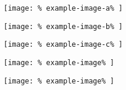 \documentclass{article}
\newlength{%
		\vamaxheight%
	}
\begin{document}
%

\noindent
\begin{minipage}[b][\ht\vabox][b]{%
		.10\textwidth%
	}
	\centering
	\texttt{[image: \%
		example-image-a\%
	]}
\end{minipage}
%
\hfill
\begin{minipage}[b][\ht\vabox][t]{%
		.15\textwidth%
	}
	\centering
	\texttt{[image: \%
		example-image-b\%
	]}
\end{minipage}
%
\hfill
\begin{minipage}[b][\ht\vabox][t]{%
		.20\textwidth%
	}
	\centering
	\texttt{[image: \%
		example-image-c\%
	]}
\end{minipage}
%
\hfill
\begin{minipage}[b][\ht\vabox][c]{%
		.10\textwidth%
	}
	\centering
	\texttt{[image: \%
		example-image\%
	]}
\end{minipage}
%
\hfill
\begin{minipage}[b][\ht\vabox][t]{%
		.20\textwidth%
	}
	\centering
	\texttt{[image: \%
		example-image\%
	]}
\end{minipage}
%
\par\lipsum
\end{document}

